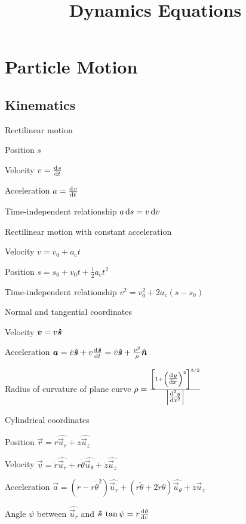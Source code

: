 \documentclass{article}
\title{Dynamics Equations}
\newcommand{\uuvec}[1]{\widehat{\vec{u}_{#1}}}
\begin{document}


\section{Particle Motion}
\label{sec:particle-motion}

\subsection{Kinematics}
\label{sec:particle-kinematics}

\begin{description*}
\item[Rectilinear motion]~
  \begin{description*}
    \item[Position] $s$
    \item[Velocity]
      \(v = \od{s}{t}\)
    \item[Acceleration]
      \(a = \od{v}{t}\)
    \item[Time-independent relationship]
      \(a\dif{s} = v\dif{v}\)
  \end{description*}
\item[Rectilinear motion with constant acceleration]~
  \begin{description*}
  \item[Velocity]
    \(v = v_0 + a_\mathrm{c}t\)
  \item[Position]
    \(s = s_0 + v_0t + \frac12a_\mathrm{c}t^2\)
  \item[Time-independent relationship]
    \(v^2 = v_0^2 + 2a_\mathrm{c}(s-s_0)\)
  \end{description*}
\item[Normal and tangential coordinates]~
  \begin{description*}
  \item[Velocity]
    \(\bm{v} = v\bm{\hat{s}}\)
  \item[Acceleration]
    \(\vec{a} = \dot{v}\uvec{s} + v\od{\uvec{s}}{t}
    = \dot{v}\uvec{s} + \frac{v^2}{\rho}\uvec{n}\)
  \item[Radius of curvature of plane curve]
    \(\rho = \frac{{\left[1+{\left(\od{y}{x}\right)}^2\right]}^{3/2}}{\left|\od[2]{y}{x}\right|}\)
  \end{description*}
\item[Cylindrical coordinates]~
  \begin{description*}
  \item[Position]
    \(\vec{r} = r\uuvec{r} + z\uuvec{z}\)
  \item[Velocity]
    \(\vec{v} = \dot{r}\uuvec{r} + r\dot{\theta}\uuvec{\theta} + \dot{z}\uuvec{z}\)
  \item[Acceleration]
    \(\vec{a}
    = (\ddot{r}-r\dot\theta^2)\uuvec{r}
    + (r\ddot\theta+2\dot{r}\dot\theta)\uuvec\theta
    + \ddot{z}\uuvec{z}\)
  \item[Angle $\psi$ between $\uuvec{r}$ and $\bm{\hat{s}}$]
    \(\tan\psi = r\od{\theta}{r}\)
  \end{description*}
\end{description*}
\end{document}
